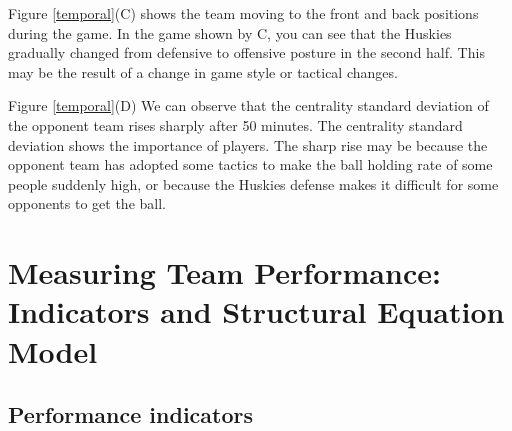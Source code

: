 \documentclass{mcmthesis}
\begin{document}
Figure \ref{temporal}(C) shows the team moving to the front and back positions during the game. In the game shown by C, you can see that the Huskies gradually changed from defensive to offensive posture in the second half. This may be the result of a change in game style or tactical changes.

Figure \ref{temporal}(D) We can observe that the centrality standard deviation of the opponent team rises sharply after 50 minutes. The centrality standard deviation shows the importance of players. The sharp rise may be because the opponent team has adopted some tactics to make the ball holding rate of some people suddenly high, or because the Huskies defense makes it difficult for some opponents to get the ball.



\section{Measuring Team Performance: Indicators and Structural Equation Model}

\subsection{Performance indicators}
\end{document}
